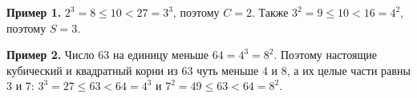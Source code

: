\textbf{Пример 1.} $2^3 = 8 \le 10 < 27 = 3^3$, поэтому $C = 2$. Также $3^2 = 9 \le 10 < 16 = 4^2$, поэтому $S = 3$.

\textbf{Пример 2.} Число $63$ на единицу меньше $64 = 4^3 = 8^2$. Поэтому настоящие кубический и квадратный корни из $63$ чуть меньше $4$ и $8$, а их целые части равны $3$ и $7$: $3^3 = 27 \le 63 < 64 = 4^3$ и $7^2 = 49 \le 63 < 64 = 8^2$.
